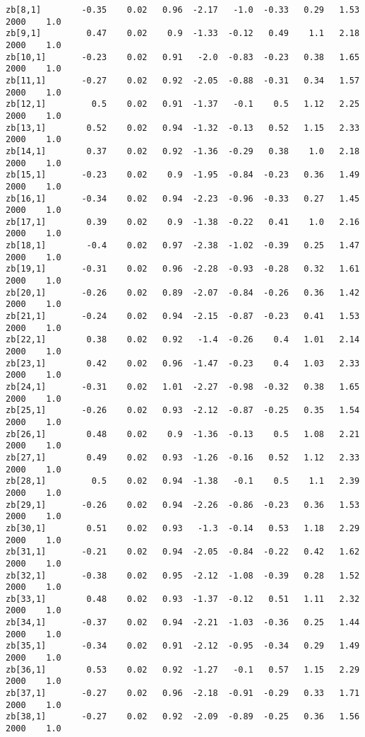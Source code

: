 \documentclass[11pt]{article}
\begin{document}
\begin{Verbatim}[commandchars=\\\{\}]
zb[8,1]        -0.35    0.02   0.96  -2.17   -1.0  -0.33   0.29   1.53   2000    1.0
zb[9,1]         0.47    0.02    0.9  -1.33  -0.12   0.49    1.1   2.18   2000    1.0
zb[10,1]       -0.23    0.02   0.91   -2.0  -0.83  -0.23   0.38   1.65   2000    1.0
zb[11,1]       -0.27    0.02   0.92  -2.05  -0.88  -0.31   0.34   1.57   2000    1.0
zb[12,1]         0.5    0.02   0.91  -1.37   -0.1    0.5   1.12   2.25   2000    1.0
zb[13,1]        0.52    0.02   0.94  -1.32  -0.13   0.52   1.15   2.33   2000    1.0
zb[14,1]        0.37    0.02   0.92  -1.36  -0.29   0.38    1.0   2.18   2000    1.0
zb[15,1]       -0.23    0.02    0.9  -1.95  -0.84  -0.23   0.36   1.49   2000    1.0
zb[16,1]       -0.34    0.02   0.94  -2.23  -0.96  -0.33   0.27   1.45   2000    1.0
zb[17,1]        0.39    0.02    0.9  -1.38  -0.22   0.41    1.0   2.16   2000    1.0
zb[18,1]        -0.4    0.02   0.97  -2.38  -1.02  -0.39   0.25   1.47   2000    1.0
zb[19,1]       -0.31    0.02   0.96  -2.28  -0.93  -0.28   0.32   1.61   2000    1.0
zb[20,1]       -0.26    0.02   0.89  -2.07  -0.84  -0.26   0.36   1.42   2000    1.0
zb[21,1]       -0.24    0.02   0.94  -2.15  -0.87  -0.23   0.41   1.53   2000    1.0
zb[22,1]        0.38    0.02   0.92   -1.4  -0.26    0.4   1.01   2.14   2000    1.0
zb[23,1]        0.42    0.02   0.96  -1.47  -0.23    0.4   1.03   2.33   2000    1.0
zb[24,1]       -0.31    0.02   1.01  -2.27  -0.98  -0.32   0.38   1.65   2000    1.0
zb[25,1]       -0.26    0.02   0.93  -2.12  -0.87  -0.25   0.35   1.54   2000    1.0
zb[26,1]        0.48    0.02    0.9  -1.36  -0.13    0.5   1.08   2.21   2000    1.0
zb[27,1]        0.49    0.02   0.93  -1.26  -0.16   0.52   1.12   2.33   2000    1.0
zb[28,1]         0.5    0.02   0.94  -1.38   -0.1    0.5    1.1   2.39   2000    1.0
zb[29,1]       -0.26    0.02   0.94  -2.26  -0.86  -0.23   0.36   1.53   2000    1.0
zb[30,1]        0.51    0.02   0.93   -1.3  -0.14   0.53   1.18   2.29   2000    1.0
zb[31,1]       -0.21    0.02   0.94  -2.05  -0.84  -0.22   0.42   1.62   2000    1.0
zb[32,1]       -0.38    0.02   0.95  -2.12  -1.08  -0.39   0.28   1.52   2000    1.0
zb[33,1]        0.48    0.02   0.93  -1.37  -0.12   0.51   1.11   2.32   2000    1.0
zb[34,1]       -0.37    0.02   0.94  -2.21  -1.03  -0.36   0.25   1.44   2000    1.0
zb[35,1]       -0.34    0.02   0.91  -2.12  -0.95  -0.34   0.29   1.49   2000    1.0
zb[36,1]        0.53    0.02   0.92  -1.27   -0.1   0.57   1.15   2.29   2000    1.0
zb[37,1]       -0.27    0.02   0.96  -2.18  -0.91  -0.29   0.33   1.71   2000    1.0
zb[38,1]       -0.27    0.02   0.92  -2.09  -0.89  -0.25   0.36   1.56   2000    1.0

\end{Verbatim}
\end{document}
